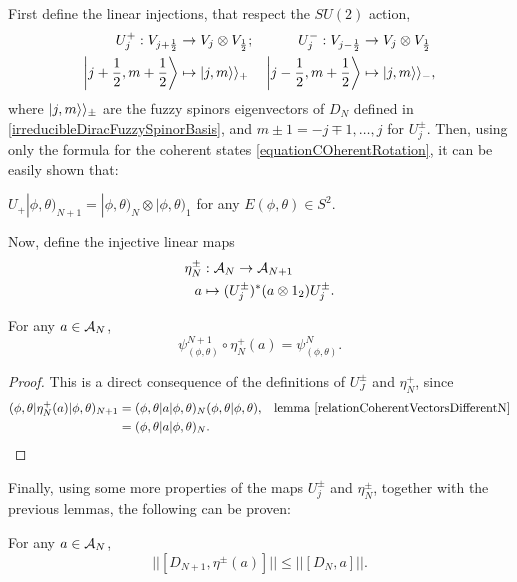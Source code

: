First define the linear injections, that respect the $SU(2)$ action,
\begin{align*}
    U^+_j : V_{j+\frac{1}{2}} &\to V_j \otimes V_{\frac{1}{2}}; 
    & U^-_j : V_{j-\frac{1}{2}} &\to V_j \otimes V_{\frac{1}{2}} \\
    \left|j + \frac{1}{2}, m + \frac{1}{2}\right\rangle &\mapsto |j, m\rangle\rangle_+ &
    \left|j - \frac{1}{2}, m + \frac{1}{2}\right\rangle &\mapsto |j, m\rangle\rangle_-,
\end{align*} where $|j, m\rangle\rangle_\pm$ are the fuzzy spinors eigenvectors of $D_N$ defined in \ref{irreducibleDiracFuzzySpinorBasis}, and $m \pm 1 = -j \mp 1, \dots, j$ for $U_j^\pm$. 
Then, using only the formula for the coherent states \eqref{equationCOherentRotation}, it can be easily shown that:

\begin{lemma}\label{relationCoherentVectorsDifferentN}
$U_+|\phi, \theta)_{N+1} = |\phi, \theta)_N \otimes |\phi, \theta)_1$ for any $E(\phi, \theta) \in S^2$.
\end{lemma}

Now, define the injective linear maps
\begin{align*}
    \eta^\pm_N &: \mathcal A_N \to \mathcal A_{N+1} \\
    a &\mapsto (U_j^\pm)^*(a \otimes 1_2) U_j^\pm.
\end{align*}

\begin{lemma} \label{relationDifferentNCoherentStates}
For any $a \in \mathcal A_N$,
\begin{equation}
    \psi^{N+1}_{(\phi, \theta)} \circ \eta_N^+(a) = \psi^N_{(\phi, \theta)}.
\end{equation}
\end{lemma}
\begin{proof}
This is a direct consequence of the definitions of $U_J^\pm$ and $\eta_N^+$, since
\begin{align*}
    (\phi, \theta| \eta^+_N(a) |\phi, \theta)_{N+1} &= (\phi, \theta|a|\phi, \theta)_N (\phi, \theta| \phi, \theta), & \text{lemma \ref{relationCoherentVectorsDifferentN}}\\
        &= (\phi, \theta| a | \phi, \theta)_N.
\end{align*}
\end{proof}

Finally, using some more properties of the maps $U_j^\pm$ and $\eta^\pm_N$, together with the previous lemmas, the following can be proven:
\begin{lemma}\label{normCommutatorsDiracDifferentNRelation}
For any $a \in \mathcal A_N$,
\begin{equation}
    ||[D_{N+1}, \eta^\pm(a)]|| \leq ||[D_N, a]||.
\end{equation}
\end{lemma}

